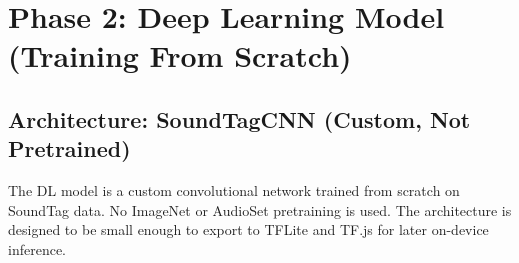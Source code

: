 \documentclass[11pt,a4paper]{article}
\begin{document}
\section{Phase 2: Deep Learning Model (Training From Scratch)}

\subsection{Architecture: SoundTagCNN (Custom, Not Pretrained)}

The DL model is a custom convolutional network trained from scratch on
SoundTag data. No ImageNet or AudioSet pretraining is used. The architecture
is designed to be small enough to export to TFLite and TF.js for later
on-device inference.
\end{document}
